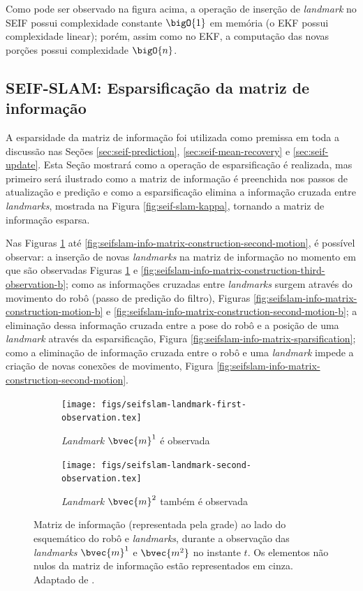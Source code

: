 Como pode ser observado na figura acima, a operação de inserção de \textit{landmark} no SEIF possui complexidade constante $\bigO{1}$ em memória (o EKF possui complexidade linear); porém, assim como no EKF, a computação das 
novas porções possui complexidade $\bigO{n}$.

\subsection{SEIF-SLAM: Esparsificação da matriz de informação}
A esparsidade da matriz de informação foi utilizada como premissa em 
toda a discussão nas Seções \ref{sec:seif-prediction}, \ref{sec:seif-mean-recovery} e \ref{sec:seif-update}. Esta Seção mostrará como a operação de esparsificação é realizada, mas primeiro será 
ilustrado como a matriz de informação é preenchida nos passos de 
atualização e predição e como a esparsificação elimina a informação 
cruzada entre \textit{landmarks}, mostrada na Figura \ref{fig:seif-slam-kappa}, tornando a matriz de informação esparsa.

Nas Figuras \ref{fig:seifslam-info-matrix-construction-observation} até \ref{fig:seifslam-info-matrix-construction-second-motion}, é possível 
observar: a inserção de novas \textit{landmarks} na matriz de informação no momento em que são observadas Figuras \ref{fig:seifslam-info-matrix-construction-observation} e \ref{fig:seifslam-info-matrix-construction-third-observation-b}; como as 
informações cruzadas entre \textit{landmarks} surgem através do 
movimento do robô (passo de predição do filtro), Figuras \ref{fig:seifslam-info-matrix-construction-motion-b} e \ref{fig:seifslam-info-matrix-construction-second-motion-b}; a 
eliminação dessa informação cruzada entre a pose do robô e a posição de uma \textit{landmark} através da esparsificação, Figura \ref{fig:seifslam-info-matrix-sparsification}; como a eliminação de 
informação cruzada entre o robô e uma \textit{landmark} impede a criação de novas conexões de movimento, Figura \ref{fig:seifslam-info-matrix-construction-second-motion}.

\begin{figure}[h]
  \begin{subfigure}{0.475\textwidth}
    \texttt{[image: figs/seifslam-landmark-first-observation.tex]} 
    \caption{\textit{Landmark} $\bvec{m}^1$ é observada}
  \end{subfigure}
  \hfill
  \begin{subfigure}{0.475\textwidth}
    \texttt{[image: figs/seifslam-landmark-second-observation.tex]}
    \caption{\textit{Landmark} $\bvec{m}^2$ também é observada}
  \end{subfigure}
  \caption{Matriz de informação (representada pela grade) ao lado do esquemático do robô e \textit{landmarks}, durante a observação das 
  \textit{landmarks} $\bvec{m}^1$ e $\bvec{m^2}$ no instante $t$. Os elementos não nulos da matriz de informação estão representados em cinza. Adaptado de \cite[p.~389]{bongard2006probabilistic}.}
  \label{fig:seifslam-info-matrix-construction-observation}
\end{figure}


